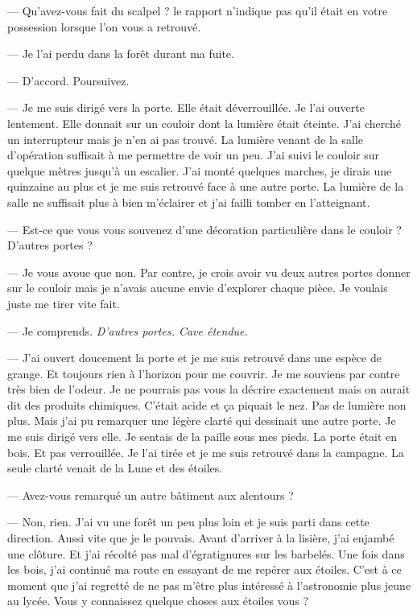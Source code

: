 — Qu'avez-vous fait du scalpel ? le rapport n'indique pas qu'il était en votre possession lorsque l'on vous a retrouvé.

— Je l'ai perdu dans la forêt durant ma fuite.

— D'accord. Poursuivez.

— Je me suis dirigé vers la porte. Elle était déverrouillée. Je l'ai ouverte lentement. Elle donnait sur un couloir
dont la lumière était éteinte. J'ai cherché un interrupteur mais je n'en ai pas trouvé. La lumière venant de la
salle d'opération suffisait à me permettre de voir un peu. J'ai suivi le couloir sur quelque mètres jusqu'à un
escalier. J'ai monté quelques marches, je dirais une quinzaine au plus et je me suis retrouvé face à une autre porte.
La lumière de la salle ne suffisait plus à bien m'éclairer et j'ai failli tomber en l'atteignant.

— Est-ce que vous vous souvenez d'une décoration particulière dans le couloir ? D'autres portes ?

— Je vous avoue que non. Par contre, je crois avoir vu deux autres portes donner sur le couloir mais je n'avais aucune
envie d'explorer chaque pièce. Je voulais juste me tirer vite fait.

— Je comprends. \emph{D'autres portes. Cave étendue.}

— J'ai ouvert doucement la porte et je me suis retrouvé dans une espèce de grange. Et toujours rien à l'horizon pour me
couvrir. Je me souviens par contre très bien de l'odeur. Je ne pourrais pas vous la décrire exactement mais on aurait
dit des produits chimiques. C'était acide et ça piquait le nez. Pas de lumière non plus. Mais j'ai pu remarquer une
légère clarté qui dessinait une autre porte. Je me suis dirigé vers elle. Je sentais de la paille sous mes pieds. La
porte était en bois. Et pas verrouillée. Je l'ai tirée et je me suis retrouvé dans la campagne. La seule clarté venait
de la Lune et des étoiles.

— Avez-vous remarqué un autre bâtiment aux alentours ?

— Non, rien. J'ai vu une forêt un peu plus loin et je suis parti dans cette direction. Aussi vite que je le pouvais.
Avant d'arriver à la lisière, j'ai enjambé une clôture. Et j'ai récolté pas mal d'égratignures sur les barbelés. Une
fois dans les bois, j'ai continué ma route en essayant de me repérer aux étoiles. C'est à ce moment que j'ai regretté
de ne pas m'être plus intéressé à l'astronomie plus jeune au lycée. Vous y connaissez quelque choses aux étoiles vous ?

